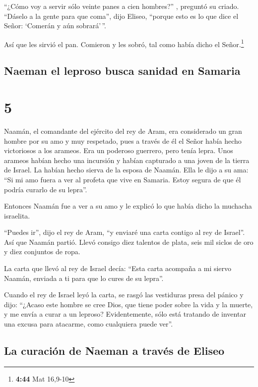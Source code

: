  ``¿Cómo voy a servir sólo veinte panes a cien hombres?''
, preguntó su criado. ``Dáselo a la gente para que coma'', dijo Eliseo,
``porque esto es lo que dice el Señor: `Comerán y aún sobrará'\,''.

 Así que les sirvió el pan. Comieron y les sobró, tal
como había dicho el Señor.\footnote{\textbf{4:44} Mat 16,9-10}

\hypertarget{naeman-el-leproso-busca-sanidad-en-samaria}{%
\subsection{Naeman el leproso busca sanidad en
Samaria}\label{naeman-el-leproso-busca-sanidad-en-samaria}}

\hypertarget{section-4}{%
\section{5}\label{section-4}}

 Naamán, el comandante del ejército del rey de Aram, era
considerado un gran hombre por su amo y muy respetado, pues a través de
él el Señor había hecho victoriosos a los arameos. Era un poderoso
guerrero, pero tenía lepra.  Unos arameos habían hecho una
incursión y habían capturado a una joven de la tierra de Israel. La
habían hecho sierva de la esposa de Naamán.  Ella le dijo
a su ama: ``Si mi amo fuera a ver al profeta que vive en Samaria. Estoy
segura de que él podría curarlo de su lepra''.

 Entonces Naamán fue a ver a su amo y le explicó lo que
había dicho la muchacha israelita.

 ``Puedes ir'', dijo el rey de Aram, ``y enviaré una carta
contigo al rey de Israel''. Así que Naamán partió. Llevó consigo diez
talentos de plata, seis mil siclos de oro y diez conjuntos de ropa.

 La carta que llevó al rey de Israel decía: ``Esta carta
acompaña a mi siervo Naamán, enviada a ti para que lo cures de su
lepra''.

 Cuando el rey de Israel leyó la carta, se rasgó las
vestiduras presa del pánico y dijo: ``¿Acaso este hombre se cree Dios,
que tiene poder sobre la vida y la muerte, y me envía a curar a un
leproso? Evidentemente, sólo está tratando de inventar una excusa para
atacarme, como cualquiera puede ver''.

\hypertarget{la-curaciuxf3n-de-naeman-a-travuxe9s-de-eliseo}{%
\subsection{La curación de Naeman a través de
Eliseo}\label{la-curaciuxf3n-de-naeman-a-travuxe9s-de-eliseo}}

